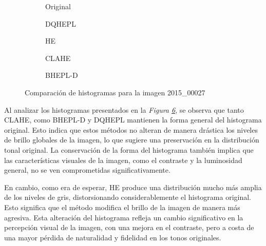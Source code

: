 \documentclass[sigchi]{acmart}
\begin{document}
\begin{figure}[htbp]
	\centering
	\begin{subfigure}[b]{0.45\textwidth}
		\resizebox{\linewidth}{!}{}
		\caption{Original}
		\label{fig:original_3}
	\end{subfigure}
	\hfill
	\begin{subfigure}[b]{0.45\textwidth}
		\resizebox{\linewidth}{!}{}
		\caption{DQHEPL}
		\label{fig:dqhepl_3}
	\end{subfigure}

	\begin{subfigure}[b]{0.45\textwidth}
		\resizebox{\linewidth}{!}{}
		\caption{HE}
		\label{fig:he_3}
	\end{subfigure}
	\hfill
	\begin{subfigure}[b]{0.45\textwidth}
		\resizebox{\linewidth}{!}{}
		\caption{CLAHE}
		\label{fig:clahe_3}
	\end{subfigure}

	\centering
	\begin{subfigure}[b]{0.45\textwidth}
		\resizebox{\linewidth}{!}{}
		\caption{BHEPL-D}
		\label{fig:bhepl_3}
	\end{subfigure}

	\caption{Comparación de histogramas para la imagen 2015\_00027}
	\label{fig:histogramas_3}
\end{figure}

Al analizar los histogramas presentados en la \emph{Figura \ref{fig:histogramas_3}}, se observa que
tanto CLAHE, como BHEPL-D y DQHEPL mantienen la forma general del histograma original. Esto
indica que estos métodos no alteran de manera drástica los niveles de brillo globales de la
imagen, lo que sugiere una preservación en la distribución tonal original. La conservación de
la forma del histograma también implica que las características visuales de la imagen, como el
contraste y la luminosidad general, no se ven comprometidas significativamente.

En cambio, como era de esperar, HE produce una distribución mucho más amplia de los niveles de
gris, distorsionando considerablemente el histograma original. Esto significa que el método
modifica el brillo de la imagen de manera más agresiva. Esta alteración del histograma refleja
un cambio significativo en la percepción visual de la imagen, con una mejora en el contraste,
pero a costa de una mayor pérdida de naturalidad y fidelidad en los tonos originales.
\end{document}
